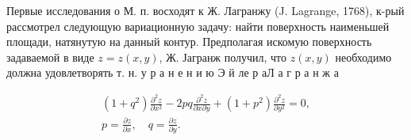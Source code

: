 \documentclass[10pt]{article}
\begin{document}
Первые исследования о М. п. восходят к Ж. Лагранжу (J. Lagrange, 1768), к-рый рассмотрел следующую вариационную задачу: найти поверхность наименьшей площади, натянутую на данный контур. Предполагая искомую поверхность задаваемой в виде $z=z(x, y)$, Ж. Јагранж получил, что $z(x, y)$ необходимо должна удовлетворять т. н. у р а н е н и ю Э й ле р аЛ а г р а н ж а



\[

\begin{gathered}

\left(1+q^{2}\right) \frac{\partial^{2} z}{\partial x^{2}}-2 p q \frac{\partial^{2} z}{\partial x \partial y}+\left(1+p^{2}\right) \frac{\partial^{2} z}{\partial y^{2}}=0, \\

p=\frac{\partial z}{\partial x}, \quad q=\frac{\partial z}{\partial y} .

\end{gathered}

\]
\end{document}
